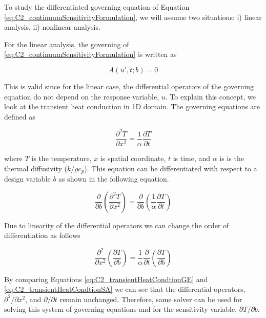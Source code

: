 To study the differentiated governing equation of Equation \eqref{eq:C2_continuumSensitivityFormulation}, we will assume two situations: i) linear analysis, ii) nonlinear analysis.

For the linear analysis, the governing  of \eqref{eq:C2_continuumSensitivityFormulation} is written as

\begin{equation}\label{eq:C2_linearSAgoverningEquation}
	A(u', t; b) = 0 
\end{equation}

This is valid since for the linear case, the differential operators of the governing equation do not depend on the response variable, $u$. To explain this concept, we look at the transient heat conduction in 1D domain. The governing equations are defined as

\begin{equation}\label{eq:C2_transientHeatCondtionGE}
	\frac{\partial^2 T}{\partial x^2} = \frac{1}{\alpha} \frac{\partial T}{\partial t}
\end{equation}

where $T$ is the temperature, $x$ is spatial coordinate, $t$ is time, and $\alpha$ is is the thermal diffusivity ($k/\rho c_p$). This equation can be differentiated with respect to a design variable $b$ as shown in the following equation.

\begin{equation*}
	\frac{\partial}{\partial b}
	\left( \frac{\partial^2 T}{\partial x^2}\right) = 
	\frac{\partial}{\partial b}
	\left( \frac{1}{\alpha} \frac{\partial T}{\partial t}\right)
\end{equation*}

Due to linearity of the differential operators we can change the order of differentiation as follows

\begin{equation}\label{eq:C2_transientHeatCondtionSA}
	\frac{\partial^2}{\partial x^2}
	\left( \frac{\partial T}{\partial b} \right) = 
	\frac{1}{\alpha} \frac{\partial}{\partial t}
	\left( \frac{\partial T}{\partial b}\right)
\end{equation}

By comparing Equations \eqref{eq:C2_transientHeatCondtionGE} and \eqref{eq:C2_transientHeatCondtionSA} we can see that the differential operators, $\partial^2 /\partial x^2$, and $\partial /\partial t$ remain unchanged. Therefore, same solver can be used for solving this system of governing equations and for the sensitivity variable, $\partial T/\partial b$.

